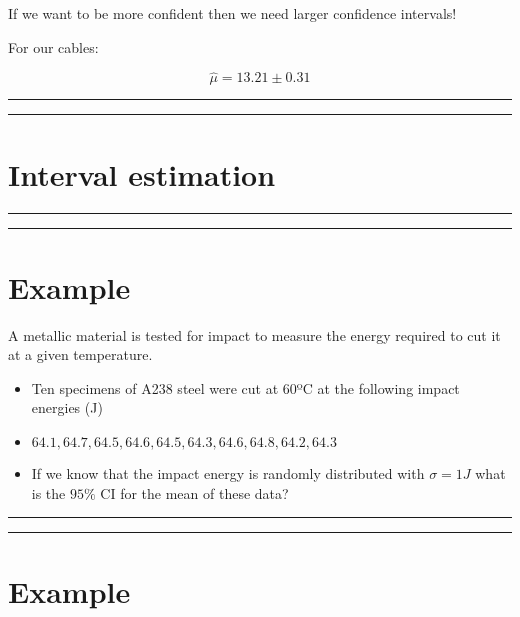\documentclass[
]{book}
\begin{document}
If we want to be more confident then we need larger confidence intervals!

For our cables:

\[\hat{\mu}= 13.21 \pm 0.31\]

\begin{center}\rule{0.5\linewidth}{0.5pt}\end{center}

\begin{center}\rule{0.5\linewidth}{0.5pt}\end{center}

\hypertarget{interval-estimation-8}{%
\section{Interval estimation}\label{interval-estimation-8}}

\begin{center}\rule{0.5\linewidth}{0.5pt}\end{center}

\begin{center}\rule{0.5\linewidth}{0.5pt}\end{center}

\hypertarget{example-16}{%
\section{Example}\label{example-16}}

A metallic material is tested for impact to measure the energy required to cut it at a given temperature.

\begin{itemize}
\item
  Ten specimens of A238 steel were cut at 60ºC at the following impact energies (J)
\item
  \(64.1, 64.7, 64.5, 64.6, 64.5, 64.3, 64.6, 64.8, 64.2, 64.3\)
\item
  If we know that the impact energy is randomly distributed with \(\sigma=1J\) what is the \(95\%\) CI for the mean of these data?
\end{itemize}

\begin{center}\rule{0.5\linewidth}{0.5pt}\end{center}

\begin{center}\rule{0.5\linewidth}{0.5pt}\end{center}

\hypertarget{example-17}{%
\section{Example}\label{example-17}}
\end{document}
